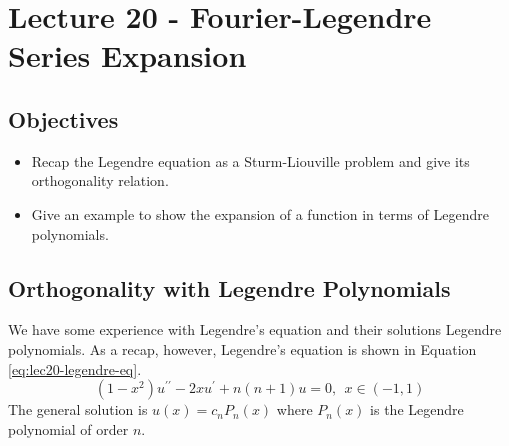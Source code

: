 \chapter{Lecture 20 - Fourier-Legendre Series Expansion}
\label{ch:lec20}
\section{Objectives}
\begin{itemize}
\item Recap the Legendre equation as a Sturm-Liouville problem and give its orthogonality relation.
\item Give an example to show the expansion of a function in terms of Legendre polynomials.
\end{itemize}
\setcounter{lstannotation}{0} %
\section{Orthogonality with Legendre Polynomials}
We have some experience with Legendre's equation and their solutions Legendre polynomials.  As a recap, however, Legendre's equation is shown in Equation \ref{eq:lec20-legendre-eq}.
\begin{equation}
\left(1-x^2\right)u^{\prime \prime} - 2xu^{\prime} + n(n+1)u = 0, \ \ x \in (-1,1)
\label{eq:lec20-legendre-eq}
\end{equation}
The general solution is $u(x) = c_nP_n(x)$ where $P_n(x)$ is the Legendre polynomial of order $n$.  

